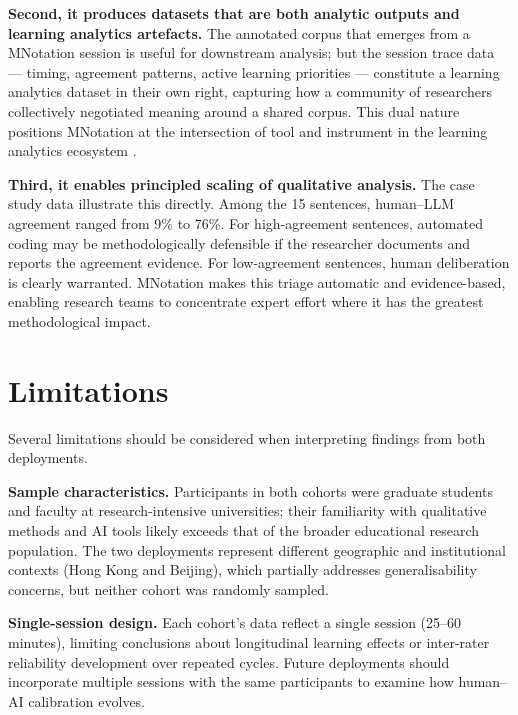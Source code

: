 \documentclass[fleqn,10pt]{JLA_article}
\begin{document}
\textbf{Second, it produces datasets that are both analytic outputs and learning
analytics artefacts.} The annotated corpus that emerges from a MNotation session is
useful for downstream analysis; but the session trace data — timing, agreement patterns,
active learning priorities — constitute a learning analytics dataset in their own right,
capturing how a community of researchers collectively negotiated meaning around a shared
corpus. This dual nature positions MNotation at the intersection of tool and instrument
in the learning analytics ecosystem \cite{gasevic2023empowering}.

\textbf{Third, it enables principled scaling of qualitative analysis.} The case study
data illustrate this directly. Among the 15 sentences, human--LLM agreement ranged from
9\% to 76\%. For high-agreement sentences, automated coding may be methodologically
defensible if the researcher documents and reports the agreement evidence. For low-agreement
sentences, human deliberation is clearly warranted. MNotation makes this triage automatic
and evidence-based, enabling research teams to concentrate expert effort where it has the
greatest methodological impact.

\section{Limitations}

Several limitations should be considered when interpreting findings from both deployments.

\textbf{Sample characteristics.} Participants in both cohorts were graduate students and
faculty at research-intensive universities; their familiarity with qualitative methods and
AI tools likely exceeds that of the broader educational research population. The two
deployments represent different geographic and institutional contexts (Hong Kong and Beijing),
which partially addresses generalisability concerns, but neither cohort was randomly sampled.

\textbf{Single-session design.} Each cohort's data reflect a single session (25--60 minutes),
limiting conclusions about longitudinal learning effects or inter-rater reliability development
over repeated cycles. Future deployments should incorporate multiple sessions with the same
participants to examine how human--AI calibration evolves.
\end{document}
